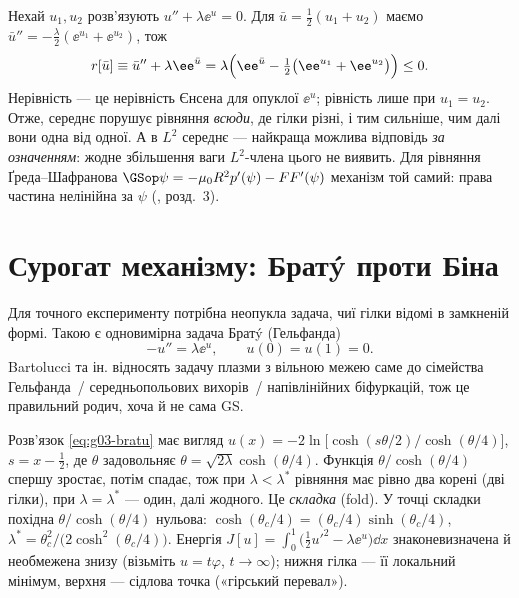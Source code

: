 \begin{derivation}
Нехай $u_1,u_2$ розв'язують $u''+\lambda\ee^{u}=0$. Для
$\bar u=\tfrac12(u_1+u_2)$ маємо $\bar u''=-\tfrac{\lambda}{2}(\ee^{u_1}+\ee^{u_2})$, тож
\begin{equation}\label{eq:g03-jensen}
r[\bar u]\equiv\bar u''+\lambda\ee^{\bar u}
=\lambda\Bigl(\ee^{\bar u}-\tfrac12\bigl(\ee^{u_1}+\ee^{u_2}\bigr)\Bigr)\le0 .
\end{equation}
Нерівність --- це нерівність Єнсена для опуклої $\ee^{u}$; рівність лише при $u_1=u_2$.
Отже, середнє порушує рівняння \emph{всюди}, де гілки різні, і тим сильніше, чим далі
вони одна від одної. А в $L^2$ середнє --- найкраща можлива відповідь \emph{за
означенням}: жодне збільшення ваги $L^2$-члена цього не виявить. Для рівняння
Ґреда--Шафранова $\GSop\psi=-\mu_0R^2p'(\psi)-FF'(\psi)$ механізм той самий: права
частина нелінійна за $\psi$ (\cite{Manual}, розд.~3).
\end{derivation}

\section{Сурогат механізму: Братý проти Біна}\label{sec:g03-bratu}

Для точного експерименту потрібна неопукла задача, чиї гілки відомі в замкненій формі.
Такою є одновимірна задача Братý (Гельфанда)
\begin{equation}\label{eq:g03-bratu}
-u''=\lambda\ee^{u},\qquad u(0)=u(1)=0 .
\end{equation}
Bartolucci та ін. \cite{Bartolucci2021} відносять задачу плазми з вільною межею саме до
сімейства Гельфанда~/ середньопольових вихорів~/ напівлінійних біфуркацій, тож це
правильний родич, хоча й не сама GS.

\begin{outofcorpus}
Розв'язок \eqref{eq:g03-bratu} має вигляд
$u(x)=-2\ln\bigl[\cosh(s\theta/2)/\cosh(\theta/4)\bigr]$, $s=x-\tfrac12$, де $\theta$
задовольняє $\theta=\sqrt{2\lambda}\cosh(\theta/4)$. Функція $\theta/\cosh(\theta/4)$ спершу
зростає, потім спадає, тож при $\lambda<\lambda^{*}$ рівняння має рівно два корені (дві
гілки), при $\lambda=\lambda^{*}$ --- один, далі жодного. Це \emph{складка} (fold). У точці
складки похідна $\theta/\cosh(\theta/4)$ нульова: $\cosh(\theta_c/4)=(\theta_c/4)\sinh(\theta_c/4)$,
$\lambda^{*}=\theta_c^2/\bigl(2\cosh^2(\theta_c/4)\bigr)$. Енергія
$J[u]=\int_0^1\bigl(\tfrac12u'^2-\lambda\ee^{u}\bigr)\dd x$ знаконевизначена й необмежена
знизу (візьміть $u=t\varphi$, $t\to\infty$); нижня гілка --- її локальний мінімум,
верхня --- сідлова точка («гірський перевал»).
\end{outofcorpus}

